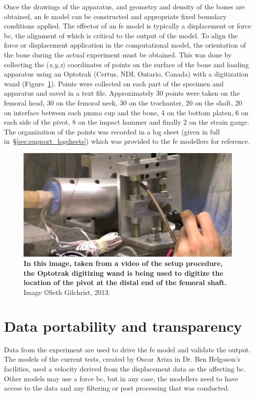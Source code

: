 Once the drawings of the apparatus, and geometry and density of the bones are obtained, an \ac{fe} model can be constructed and appropriate fixed boundary conditions applied.
The effector of an \ac{fe} model is typically a displacement or force \acl{bc}, the alignment of which is critical to the output of the model.
To align the force or displacement application in the computational model, the orientation of the bone during the actual experiment must be obtained.
This was done by collecting the (\textit{x,y,z}) coordinates of points on the surface of the bone and loading apparatus using an Optotrak (Certus, NDI, Ontario, Canada) with a digitization wand (Figure~\ref{fig:digitizing}).
Points were collected on each part of the specimen and apparatus and saved in a text file.
Approximately 30 points were taken on the femoral head, 30 on the femoral neck, 30 on the trochanter, 20 on the shaft, 20 on interface between each \ac{pmma} cup and the bone, 4 on the bottom platen, 6 on each side of the pivot, 8 on the impact hammer and finally 2 on the strain gauge.
The organization of the points was recorded in a log sheet (given in full in~\S\ref{sec:support_logsheets}) which was provided to the \ac{fe} modellers for reference.

\begin{figure}
\centering
\includegraphics[width=\linewidth]{./testing_fe_modelling/figures/digitizing}
\caption[Digitizing points on the experimental apparatus]{\textbf{In this image, taken from a video of the setup procedure, the Optotrak digitizing wand is being used to digitize the location of the pivot at the distal end of the femoral shaft.} Image \copyright Seth Gilchrist, 2013.}
\label{fig:digitizing}
\end{figure}

\section{Data portability and transparency}
\label{sec:modelling_portable}
Data from the experiment are used to drive the \ac{fe} model and validate the output.
The models of the current tests, created by Oscar Ariza in Dr. Ben Helgason's facilities, used a velocity derived from the displacement data as the affecting \ac{bc}.
Other models may use a force \ac{bc}, but in any case, the modellers need to have access to the data and any filtering or post processing that was conducted.

